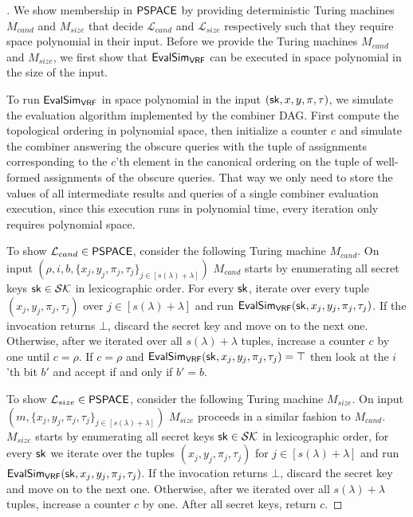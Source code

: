 \begin{proof}[]
	We show membership in $\textup{\textsf{PSPACE}}$ by providing deterministic Turing machines $M_{cand}$
	and $M_{size}$ that decide $\mathcal L_{cand}$ and $\mathcal L_{size}$ respectively
	such that they require space polynomial in their input. Before we provide the Turing machines
	$M_{cand}$ and $M_{size}$, we first show that $\alg{EvalSim}{VRF}$ can be executed in space polynomial
	in the size of the input.

	To run $\alg{EvalSim}{VRF}$ in space polynomial in the input $(\textup{\textsf{sk}}, x, y, \pi, \tau)$,
	we simulate the evaluation algorithm implemented by the combiner DAG. First compute the topological ordering
	in polynomial space, then initialize a counter $c$ and simulate the combiner answering the obscure queries 
	with the tuple of assignments corresponding to the $c$'th element in the canonical ordering on the tuple of well-formed assignments of the
	obscure queries. That way we only need to store the values of all intermediate results and queries of a single combiner evaluation execution,
	since this execution runs in polynomial time, every iteration only requires polynomial space. 

	To show $\mathcal L_{cand} \in \textup{\textsf{PSPACE}}$, consider the following Turing machine $M_{cand}$.
	On input $(\rho, i, b, \{x_j, y_j, \pi_j, \tau_j\}_{j \in [s(\lambda) + \lambda]})$
	$M_{cand}$ starts by enumerating all secret keys $\textup{\textsf{sk}} \in \mathcal{SK}$ in lexicographic order. 
	For every $\textup{\textsf{sk}}$, iterate over every tuple $(x_j,y_j,\pi_j,\tau_j)$ over $j \in [s(\lambda) + \lambda]$
	and run $\alg{EvalSim}{VRF}(\sk, x_j, y_j,\pi_j,\tau_j)$.
	If the invocation returns $\bot$, discard the secret key and move on to the next one. Otherwise, after
	we iterated over all $s(\lambda) + \lambda$ tuples, increase a counter $c$ by one
	until $c = \rho$. If $c = \rho$ and $\alg{EvalSim}{VRF}(\sk, x_j, y_j,\pi_j,\tau_j) = \top$ then 
	look at the $i$'th bit $b'$ and accept if and only if $b' = b$. 

	To show $\mathcal L_{size} \in \textup{\textsf{PSPACE}}$, consider the following Turing machine $M_{size}$.
	On input $(m, \{x_j, y_j, \pi_j, \tau_j\}_{j \in [s(\lambda) + \lambda]})$ $M_{size}$
	proceeds in a similar fashion to $M_{cand}$.
	$M_{size}$ starts by enumerating all secret keys $\textup{\textsf{sk}} \in \mathcal{SK}$ in lexicographic order,
	for every $\textup{\textsf{sk}}$ we iterate over the tuples $(x_j,y_j,\pi_j,\tau_j)$ for $j \in [s(\lambda) + \lambda]$
	and run $\alg{EvalSim}{VRF}(\sk, x_j, y_j,\pi_j,\tau_j)$.
	If the invocation returns $\bot$, discard the secret key and move on to the next one.
	Otherwise, after
	we iterated over all $s(\lambda) + \lambda$ tuples, increase a counter $c$ by one.
	After all secret keys, return $c$.
\end{proof}

